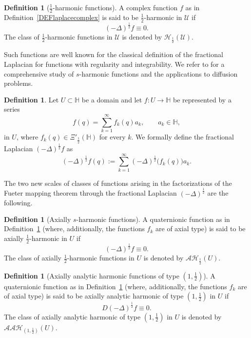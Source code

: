 \documentclass[reqno,11pt]{amsart}
\theoremstyle{definition}
\newtheorem{definition}[theorem]{Definition}
\begin{document}
\begin{definition}[$\frac{1}{2}$-harmonic functions]\label{DEFharmonicfunctions}
	A complex function $f$  as in Definition~\ref{DEFlaplacecomplex} is said to be $\frac{1}{2}$-harmonic in $\mathcal{U}$ if
	\[
	(-\Delta)^\frac{1}{2} f \equiv 0.
	\]
	The class of $\frac{1}{2}$-harmonic functions in $\mathcal{U}$ is denoted by $\mathcal{H}_\frac{1}{2}(\mathcal{U})$.
\end{definition}


Such functions are well known for the classical definition of the fractional Laplacian for functions with regularity and integrability. We refer to \cite{BV, DSV, DTV} for a comprehensive study of $s$-harmonic functions and the applications to diffusion problems.





\begin{definition}\label{DEFquaternioniclaplacian}
	Let $U\subset \mathbb{H}$ be a domain and let $f:U\to \mathbb{H}$ be represented by a series
	\[
	f(q) = \sum_{k=1}^\infty f_{k}(q) a_{k}, \qquad a_{k}\in \mathbb{H},
	\]
	in $U$, where $f_k(q)\in \Xi'_{\frac{1}{2}}(\mathbb{H})$ for every $k$. We formally define the fractional Laplacian $(-\Delta)^\frac{1}{2}f$ as
	\begin{equation}
		\label{EQdeflapquaternion}
	(-\Delta)^\frac{1}{2}f(q) := \sum_{k=1}^\infty (-\Delta)^\frac{1}{2}\big(f_{k}(q)\big) a_{k}.
	\end{equation}
\end{definition}





The two new scales of classes of functions arising in the factorizations of the Fueter mapping theorem through the fractional Laplacian  $(-\Delta)^\frac{1}{2}$ are the following.

\begin{definition}[Axially $s$-harmonic functions]\label{DEFaxiallyharmonic}
	A quaternionic function as in Definition~\ref{DEFquaternioniclaplacian} (where, additionally, the functions $f_k$ are of axial type) is said to be
	axially $\frac{1}{2}$-harmonic  in $U$ if
	\[
	(-\Delta)^\frac{1}{2} f \equiv 0.
	\]
	The class of axially $\frac{1}{2}$-harmonic functions  in $U$ is denoted by $\mathcal{AH}_\frac{1}{2}(U)$.
\end{definition}





\begin{definition}[Axially analytic harmonic functions of type $(1,\frac{1}{2})$]
	\label{polyclif}
	A quaternionic function as in Definition~\ref{DEFquaternioniclaplacian} (where, additionally, the functions $f_k$ are of axial type) is said to be axially analytic
	harmonic of type $(1,\frac{1}{2})$ in $U$ if
	\[
	D(-\Delta)^\frac{1}{2} f \equiv0.
	\]
	The class of axially analytic harmonic of type $(1,\frac{1}{2})$ in $U$ is denoted by $\mathcal{AAH}_{(1,\frac{1}{2})}(U)$.
\end{definition}
\end{document}
